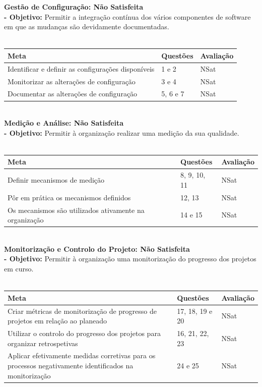\documentclass[openany,10pt,a4paper]{article}
\begin{document}
\textbf{Gestão de Configuração: Não Satisfeita} \\
\textbf{- Objetivo:} Permitir a integração contínua dos vários componentes de software em que as mudanças são devidamente documentadas. \\ \\
\begin{tabular}{|p{3.7in}|p{1in}|p{1in}|}
	\hline
	\textbf{Meta} & \textbf{Questões} & \textbf{Avaliação} \\ \hline
	Identificar e definir as configurações disponíveis & 1 e 2 & NSat \\
	Monitorizar as alterações de configuração  & 3 e 4 & NSat \\
	Documentar as alterações de configuração  & 5, 6 e 7 & NSat \\ \hline
\end{tabular} \\

\textbf{Medição e Análise: Não Satisfeita} \\ 
\textbf{- Objetivo:} Permitir à organização realizar uma medição da sua qualidade. \\ \\
\begin{tabular}{|p{3.7in}|p{1in}|p{1in}|}	 \hline
\textbf{Meta} & \textbf{Questões} & \textbf{Avaliação} \\ \hline
Definir mecanismos de medição & 8, 9, 10, 11 & NSat \\
Pôr em prática os mecanismos definidos  & 12, 13 & NSat \\
Os mecanismos são utilizados ativamente na organização & 14 e 15 & NSat \\ \hline
\end{tabular} \\

\textbf{Monitorização e Controlo do Projeto: Não Satisfeita} \\ 
\textbf{- Objetivo:} Permitir à organização uma monitorização do progresso dos projetos em curso. \\
\\
\begin{tabular}{|p{3.7in}|p{1in}|p{1in}|}	\hline
\textbf{Meta} & \textbf{Questões} & \textbf{Avaliação} \\ \hline
Criar métricas de monitorização de progresso de projetos em relação ao planeado & 17, 18, 19 e 20 & NSat \\
Utilizar o controlo do progresso dos projetos para organizar retrospetivas & 16, 21, 22, 23 & NSat \\
Aplicar efetivamente medidas corretivas para os processos negativamente identificados na monitorização & 24 e 25 & NSat \\\hline
\end{tabular} \\
\end{document}
